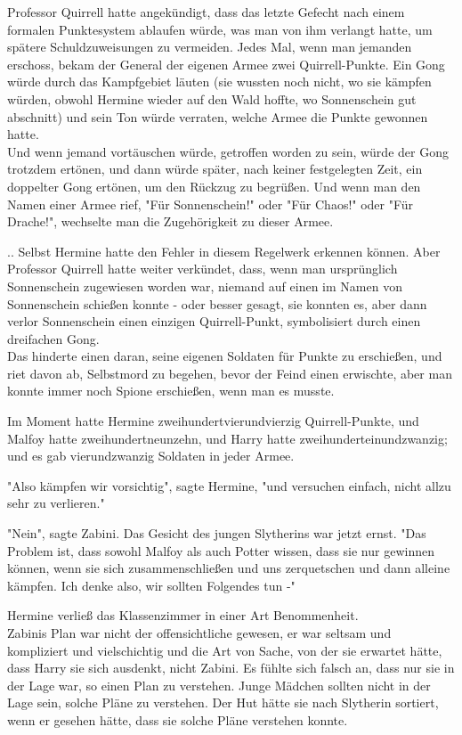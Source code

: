 {Professor Quirrell hatte angekündigt, dass das letzte Gefecht nach einem formalen Punktesystem ablaufen würde, was man von ihm verlangt hatte, um spätere Schuldzuweisungen zu vermeiden. Jedes Mal, wenn man jemanden erschoss, bekam der General der eigenen Armee zwei Quirrell-Punkte. Ein Gong würde durch das Kampfgebiet läuten (sie wussten noch nicht, wo sie kämpfen würden, obwohl Hermine wieder auf den Wald hoffte, wo Sonnenschein gut abschnitt) und sein Ton würde verraten, welche Armee die Punkte gewonnen hatte.\\ Und wenn jemand vortäuschen würde, getroffen worden zu sein, würde der Gong trotzdem ertönen, und dann würde später, nach keiner festgelegten Zeit, ein doppelter Gong ertönen, um den Rückzug zu begrüßen. Und wenn man den Namen einer Armee rief, "Für Sonnenschein!" oder "Für Chaos!" oder "Für Drache!", wechselte man die Zugehörigkeit zu dieser Armee.

.. Selbst Hermine hatte den Fehler in diesem Regelwerk erkennen können. Aber Professor Quirrell hatte weiter verkündet, dass, wenn man ursprünglich Sonnenschein zugewiesen worden war, niemand auf einen im Namen von Sonnenschein schießen konnte - oder besser gesagt, sie konnten es, aber dann verlor Sonnenschein einen einzigen Quirrell-Punkt, symbolisiert durch einen dreifachen Gong.\\ Das hinderte einen daran, seine eigenen Soldaten für Punkte zu erschießen, und riet davon ab, Selbstmord zu begehen, bevor der Feind einen erwischte, aber man konnte immer noch Spione erschießen, wenn man es musste.

Im Moment hatte Hermine zweihundertvierundvierzig Quirrell-Punkte, und Malfoy hatte zweihundertneunzehn, und Harry hatte zweihunderteinundzwanzig; und es gab vierundzwanzig Soldaten in jeder Armee.

"Also kämpfen wir vorsichtig", sagte Hermine, "und versuchen einfach, nicht allzu sehr zu verlieren."

"Nein", sagte Zabini. Das Gesicht des jungen Slytherins war jetzt ernst. "Das Problem ist, dass sowohl Malfoy als auch Potter wissen, dass sie nur gewinnen können, wenn sie sich zusammenschließen und uns zerquetschen und dann alleine kämpfen. Ich denke also, wir sollten Folgendes tun -"

Hermine verließ das Klassenzimmer in einer Art Benommenheit.\\ Zabinis Plan war nicht der offensichtliche gewesen, er war seltsam und kompliziert und vielschichtig und die Art von Sache, von der sie erwartet hätte, dass Harry sie sich ausdenkt, nicht Zabini. Es fühlte sich falsch an, dass nur sie in der Lage war, so einen Plan zu verstehen. Junge Mädchen sollten nicht in der Lage sein, solche Pläne zu verstehen. Der Hut hätte sie nach Slytherin sortiert, wenn er gesehen hätte, dass sie solche Pläne verstehen konnte.

}
